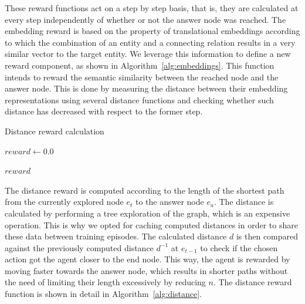 These reward functions act on a step by step basis, that is, they are calculated at every step independently of whether or not the answer node was reached. The embedding reward is based on the property of translational embeddings according to which the combination of an entity and a connecting relation results in a very similar vector to the target entity. We leverage this information to define a new reward component, as shown in Algorithm~\ref{alg:embeddings}. This function intends to reward the semantic similarity between the reached node and the answer node. This is done by measuring the distance between their embedding representations using several distance functions and checking whether such distance has decreased with respect to the former step.

\newcommand{\pluseq}{\mathrel{+}=}

\begin{algorithm}[!h]
    \caption{Distance reward calculation}
    \label{alg:distance}

    $reward \gets 0.0$


    \Return $reward$
\end{algorithm}


The distance reward is computed according to the length of the shortest path from the currently explored node $e_t$ to the answer node $e_a$. The distance is calculated by performing a tree exploration of the graph, which is an expensive operation. This is why we opted for caching computed distances in order to share these data between training episodes. The calculated distance $d$ is then compared against the previously computed distance $d^{-1}$ at $e_{t-1}$ to check if the chosen action got the agent closer to the end node. This way, the agent is rewarded by moving faster towards the answer node, which results in shorter paths without the need of limiting their length excessively by reducing $n$.
The distance reward function is shown in detail in Algorithm~\ref{alg:distance}.


